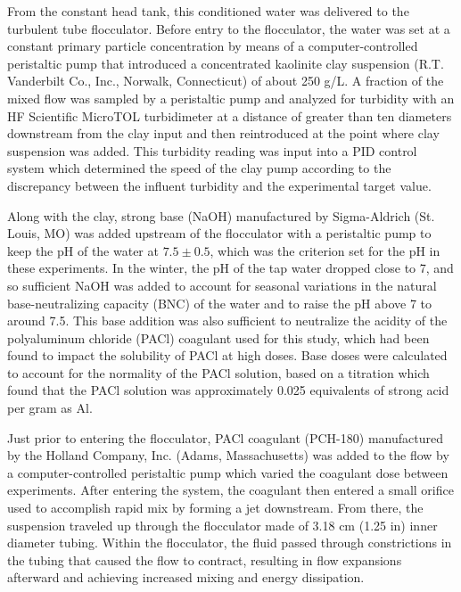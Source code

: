 \documentclass[letterpaper,10pt,english]{sphinxmanual}
\begin{document}
From the constant head tank, this conditioned water was delivered to the turbulent tube flocculator. Before entry to the flocculator, the water was set at a constant primary particle concentration by means of a computer-controlled peristaltic pump that introduced a concentrated kaolinite clay suspension (R.T. Vanderbilt Co., Inc., Norwalk, Connecticut) of about 250 g/L. A fraction of the mixed flow was sampled by a peristaltic pump and analyzed for turbidity with an HF Scientific MicroTOL turbidimeter at a distance of greater than ten diameters downstream from the clay input and then reintroduced at the point where clay suspension was added. This turbidity reading was input into a PID control system which determined the speed of the clay pump according to the discrepancy between the influent turbidity and the experimental target value.

Along with the clay, strong base (NaOH) manufactured by Sigma-Aldrich (St. Louis, MO) was added upstream of the flocculator with a peristaltic pump to keep the pH of the water at \(7.5\pm0.5\), which was the criterion set for the pH in these experiments. In the winter, the pH of the tap water dropped close to 7, and so sufficient NaOH was added to account for seasonal variations in the natural base-neutralizing capacity (BNC) of the water and to raise the pH above 7 to around 7.5.  This base addition was also sufficient to neutralize the acidity of the polyaluminum chloride (PACl) coagulant used for this study, which had been found to impact the solubility of PACl at high doses. Base doses were calculated to account for the normality of the PACl solution, based on a titration which found that the PACl solution was approximately 0.025 equivalents of strong acid per gram as Al.

Just prior to entering the flocculator,  PACl coagulant (PCH-180) manufactured by the Holland Company, Inc. (Adams, Massachusetts) was added to the flow by a computer-controlled peristaltic pump which varied the coagulant dose between experiments. After entering the system, the coagulant then entered a small orifice used to accomplish rapid mix by forming a jet downstream. From there, the suspension traveled up through the flocculator made of 3.18 cm (1.25 in) inner diameter tubing. Within the flocculator, the fluid passed through constrictions in the tubing that caused the flow to contract, resulting in flow expansions afterward and achieving increased mixing and energy dissipation.
\end{document}

